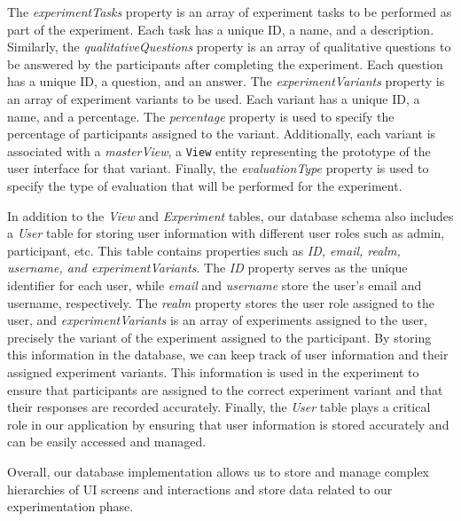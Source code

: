 The \textit{experimentTasks} property is an array of experiment tasks to be performed as part of the experiment. 
Each task has a unique ID, a name, and a description.
Similarly, the \textit{qualitativeQuestions} property is an array of qualitative questions to be answered by the participants after completing the experiment. 
Each question has a unique ID, a question, and an answer.
The \textit{experimentVariants} property is an array of experiment variants to be used. 
Each variant has a unique ID, a name, and a percentage. The \textit{percentage} property is used to specify the percentage of participants assigned to the variant. 
Additionally, each variant is associated with a \textit{masterView}, a \texttt{View} entity representing the prototype of the user interface for that variant.
Finally, the \textit{evaluationType} property is used to specify the type of evaluation that will be performed for the experiment.

In addition to the \textit{View} and \textit{Experiment} tables, our database schema also includes a \textit{User} table for storing user information with different user roles such as admin, participant, etc. 
This table contains properties such as \textit{ID, email, realm, username, and experimentVariants}.
The \textit{ID} property serves as the unique identifier for each user, while \textit{email} and \textit{username} store the user's email and username, respectively. 
The \textit{realm} property stores the user role assigned to the user, and \textit{experimentVariants} is an array of experiments assigned to the user, precisely the variant of the experiment assigned to the participant.
By storing this information in the database, we can keep track of user information and their assigned experiment variants. 
This information is used in the experiment to ensure that participants are assigned to the correct experiment variant and that their responses are recorded accurately. 
Finally, the \textit{User} table plays a critical role in our application by ensuring that user information is stored accurately and can be easily accessed and managed.

Overall, our database implementation allows us to store and manage complex hierarchies of UI screens and interactions and store data related to our experimentation phase.